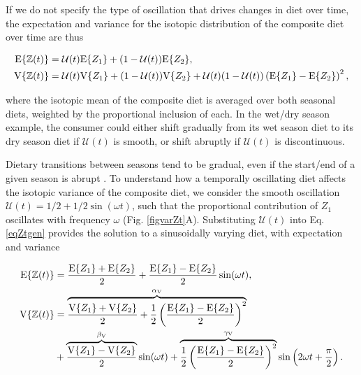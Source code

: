 \documentclass{frontiersSCNS}
\begin{document}
If we do not specify the type of oscillation that drives changes in diet over time, the expectation and variance for the isotopic distribution of the composite diet over time are thus

\begin{align}
  \label{eqZtgen}
  \begin{split}
    {\rm E}\{\mathbb{Z}(t)\} &= \mathcal{U}(t){\rm E}\{Z_1\} + (1-\mathcal{U}(t)){\rm E}\{Z_2\}, \\
    {\rm V}\{\mathbb{Z}(t)\} &= \mathcal{U}(t){\rm V}\{Z_1\} + (1-\mathcal{U}(t)){\rm V}\{Z_2\} + \mathcal{U}(t)(1-\mathcal{U}(t))\left({\rm E}\{Z_1\} - {\rm E}\{Z_2\}\right)^2,
  \end{split}
\end{align}

\noindent where the isotopic mean of the composite diet is averaged over both seasonal diets, weighted by the proportional inclusion of each.
In the wet/dry season example, the consumer could either shift gradually from its wet season diet to its dry season diet if $\mathcal{U}(t)$ is smooth, or shift abruptly if $\mathcal{U}(t)$ is discontinuous.


Dietary transitions between seasons tend to be gradual, even if the start/end of a given season is abrupt \citep{Thompson:1995co,CodronSAJWR2007}.
To understand how a temporally oscillating diet affects the isotopic variance of the composite diet, we consider the smooth oscillation $\mathcal{U}(t) = 1/2 + 1/2\sin(\omega t)$, such that the proportional contribution of $Z_1$ oscillates with frequency $\omega$ (Fig. \ref{figvarZt}A).
Substituting $\mathcal{U}(t)$ into Eq. \ref{eqZtgen} provides the solution to a sinusoidally varying diet, with expectation and variance

\begin{align}
  \begin{split}
  \label{eqZtsin}
  	{\rm E}\{\mathbb{Z}(t)\} &= \frac{{\rm E}\{Z_1\} + {\rm E}\{Z_2\}}{2} + \frac{{\rm E}\{Z_1\} - {\rm E}\{Z_2\}}{2}\sin(\omega t), \\
    {\rm V}\{\mathbb{Z}(t)\} &= \overbrace{\frac{{\rm V}\{Z_1\} + {\rm V}\{Z_2\}}{2} + \frac{1}{2} \left(\frac{{\rm E}\{Z_1\} - {\rm E}\{Z_2\}}{2}\right)^2}^{\alpha_{\rm V}} \\
    &+ \overbrace{\frac{{\rm V}\{Z_1\} - {\rm V}\{Z_2\}}{2}}^{\beta_{\rm V}}\sin(\omega t) + \overbrace{\frac{1}{2}\left(\frac{{\rm E}\{Z_1\} - {\rm E}\{Z_2\}}{2}\right)^2}^{\gamma_{\rm V}}\sin\left(2\omega t + \frac{\pi}{2}\right).
  \end{split}
\end{align}
\end{document}
